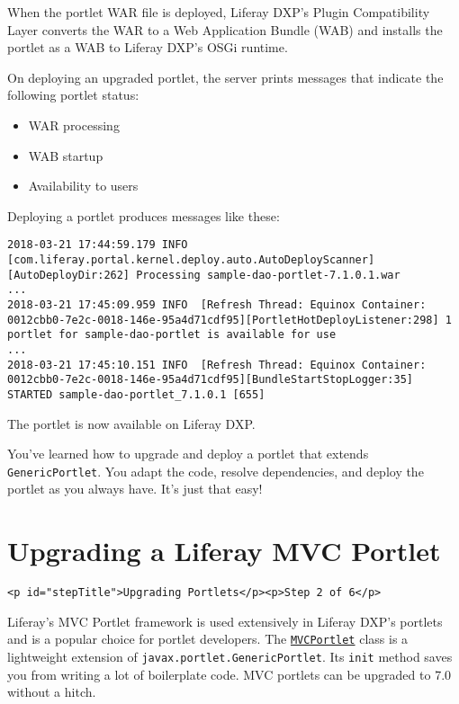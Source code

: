 When the portlet WAR file is deployed, Liferay DXP's Plugin
Compatibility Layer converts the WAR to a Web Application Bundle (WAB)
and installs the portlet as a WAB to Liferay DXP's OSGi runtime.

On deploying an upgraded portlet, the server prints messages that
indicate the following portlet status:

\begin{itemize}
\tightlist
\item
  WAR processing
\item
  WAB startup
\item
  Availability to users
\end{itemize}

Deploying a portlet produces messages like these:

\begin{verbatim}
2018-03-21 17:44:59.179 INFO  [com.liferay.portal.kernel.deploy.auto.AutoDeployScanner][AutoDeployDir:262] Processing sample-dao-portlet-7.1.0.1.war
...
2018-03-21 17:45:09.959 INFO  [Refresh Thread: Equinox Container: 0012cbb0-7e2c-0018-146e-95a4d71cdf95][PortletHotDeployListener:298] 1 portlet for sample-dao-portlet is available for use 
...
2018-03-21 17:45:10.151 INFO  [Refresh Thread: Equinox Container: 0012cbb0-7e2c-0018-146e-95a4d71cdf95][BundleStartStopLogger:35] STARTED sample-dao-portlet_7.1.0.1 [655]
\end{verbatim}

The portlet is now available on Liferay DXP.

You've learned how to upgrade and deploy a portlet that extends
\texttt{GenericPortlet}. You adapt the code, resolve dependencies, and
deploy the portlet as you always have. It's just that easy!

\chapter{Upgrading a Liferay MVC
Portlet}\label{upgrading-a-liferay-mvc-portlet}

\begin{verbatim}
<p id="stepTitle">Upgrading Portlets</p><p>Step 2 of 6</p>
\end{verbatim}

Liferay's MVC Portlet framework is used extensively in Liferay DXP's
portlets and is a popular choice for portlet developers. The
\href{https://docs.liferay.com/dxp/portal/7.2-latest/javadocs/portal-kernel/com/liferay/portal/kernel/portlet/bridges/mvc/MVCPortlet.html}{\texttt{MVCPortlet}}
class is a lightweight extension of
\texttt{javax.portlet.GenericPortlet}. Its \texttt{init} method saves
you from writing a lot of boilerplate code. MVC portlets can be upgraded
to 7.0 without a hitch.

